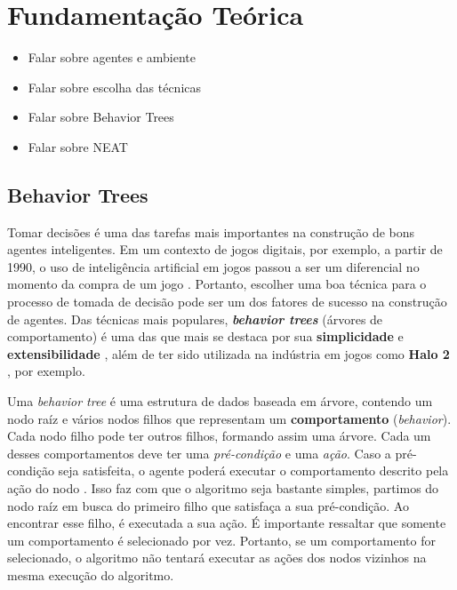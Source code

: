 \chapter{\label{chap:theory}Fundamentação Teórica}
\begin{mdframed}[backgroundcolor=green!20]
\begin{itemize}
	\item
		Falar sobre agentes e ambiente
	\item
		Falar sobre escolha das técnicas
	\item
		Falar sobre Behavior Trees
	\item
		Falar sobre NEAT
\end{itemize}
\end{mdframed}

\section{\label{section:behavior-trees}Behavior Trees}
Tomar decisões é uma das tarefas mais importantes na construção de bons agentes
inteligentes. Em um contexto de jogos digitais, por exemplo, a partir de 1990, o
uso de inteligência artificial em jogos passou a ser um diferencial no momento
da compra de um jogo \cite[Cap 1.]{Millington:2009:AIG:1795711}. Portanto,
escolher uma boa técnica para o processo de tomada de decisão pode ser um dos
fatores de sucesso na construção de agentes. Das técnicas mais populares,
\textit{\textbf{behavior trees}} (árvores de comportamento) é uma das que mais
se destaca por sua \textbf{simplicidade} e \textbf{extensibilidade} \cite[Cap.
4]{Rabin:2013:GAP:2566761}, além de ter sido utilizada na indústria em jogos
como \textbf{Halo 2} \cite[Cap.  5]{Millington:2009:AIG:1795711}, por exemplo.

Uma \textit{behavior tree} é uma estrutura de dados baseada em árvore, contendo
um nodo raíz e vários nodos filhos que representam um \textbf{comportamento}
(\textit{behavior}). Cada nodo filho pode ter outros filhos, formando assim uma
árvore. Cada um desses comportamentos deve ter uma \textit{pré-condição} e uma
\textit{ação}. Caso a pré-condição seja satisfeita, o agente poderá executar o
comportamento descrito pela ação do nodo \cite[Cap 4.]{Rabin:2013:GAP:2566761}.
Isso faz com que o algoritmo seja bastante simples, partimos do nodo raíz em
busca do primeiro filho que satisfaça a sua pré-condição. Ao encontrar esse
filho, é executada a sua ação. É importante ressaltar que somente um
comportamento é selecionado por vez. Portanto, se um comportamento for
selecionado, o algoritmo não tentará executar as ações dos nodos vizinhos na
mesma execução do algoritmo.


